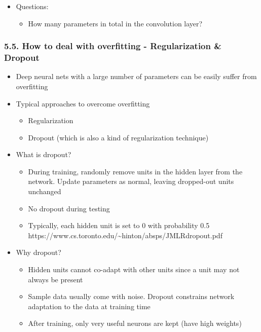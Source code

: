 \documentclass[11pt]{article}
\providecommand{\tightlist}{%
      \setlength{\itemsep}{0pt}\setlength{\parskip}{0pt}}
\begin{document}
\begin{itemize}
\tightlist
\item
  Questions:

  \begin{itemize}
  \tightlist
  \item
    How many parameters in total in the convolution layer?
  \end{itemize}
\end{itemize}

    \hypertarget{how-to-deal-with-overfitting---regularization-dropout}{%
\subsubsection{5.5. How to deal with overfitting - Regularization \&
Dropout}\label{how-to-deal-with-overfitting---regularization-dropout}}

\begin{itemize}
\tightlist
\item
  Deep neural nets with a large number of parameters can be easily
  suffer from overfitting
\item
  Typical approaches to overcome overfitting

  \begin{itemize}
  \tightlist
  \item
    Regularization
  \item
    Dropout (which is also a kind of regularization technique)
  \end{itemize}
\item
  What is dropout?

  \begin{itemize}
  \tightlist
  \item
    During training, randomly remove units in the hidden layer from the
    network. Update parameters as normal, leaving dropped-out units
    unchanged
  \item
    No dropout during testing
  \item
    Typically, each hidden unit is set to 0 with probability 0.5
    https://www.cs.toronto.edu/\textasciitilde{}hinton/absps/JMLRdropout.pdf
  \end{itemize}
\item
  Why dropout?

  \begin{itemize}
  \tightlist
  \item
    Hidden units cannot co-adapt with other units since a unit may not
    always be present
  \item
    Sample data usually come with noise. Dropout constrains network
    adaptation to the data at training time
  \item
    After training, only very useful neurons are kept (have high
    weights)
  \end{itemize}
\end{itemize}
\end{document}
